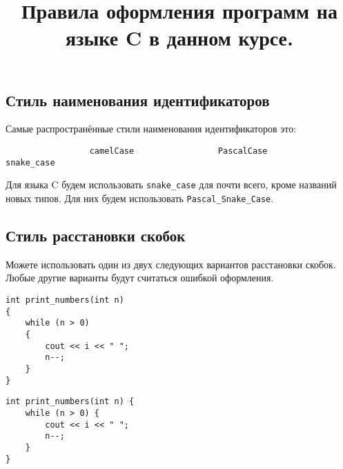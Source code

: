 \documentclass{article}
\begin{document}
\title{Правила оформления программ на языке C в данном курсе.}\date{}\maketitle
\subsection*{Стиль наименования идентификаторов}
Самые распространённые стили наименования идентификаторов это:
\begin{verbatim}
                 camelCase                 PascalCase              snake_case    
\end{verbatim}
Для языка C будем использовать \texttt{snake\_case} для почти всего, кроме названий новых типов. Для них будем использовать \texttt{Pascal\_Snake\_Case}.


\subsection*{Стиль расстановки скобок}
Можете использовать один из двух следующих вариантов расстановки скобок. Любые другие варианты будут считаться ошибкой оформления.
\vspace{-7mm}
\begin{multicols}{2}
\begin{lstlisting}[backgroundcolor = \color{correctcolor}]
int print_numbers(int n)
{
    while (n > 0)
    {
        cout << i << " ";
        n--;
    }
}
\end{lstlisting}

\begin{lstlisting}[backgroundcolor = \color{correctcolor}]
int print_numbers(int n) {
    while (n > 0) {
        cout << i << " ";
        n--;
    }
}
\end{lstlisting}

\end{multicols}
\end{document}
